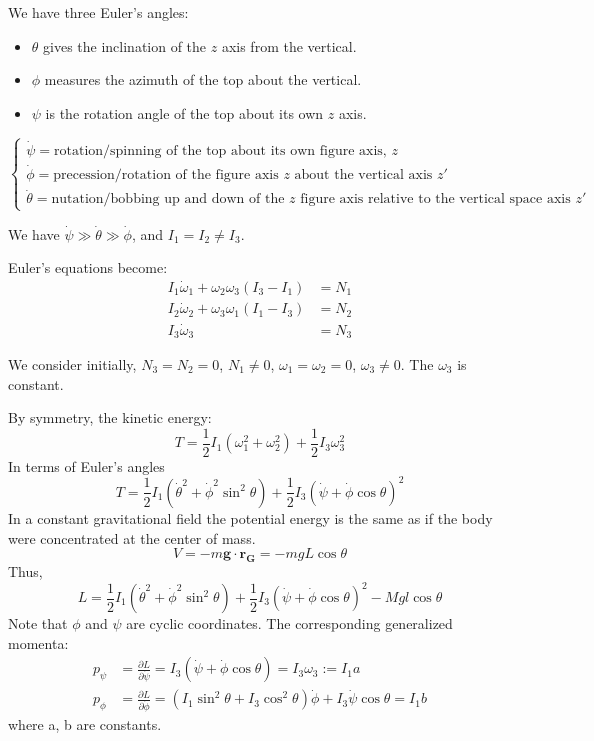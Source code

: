 \documentclass[12pt]{article}
\renewcommand{\vec}[1]{\mathbf{#1}}
\begin{document}
	We have three Euler's angles:
	\begin{itemize}
		\item $\theta$ gives the inclination of the $z$ axis from the vertical.
		\item $\phi$ measures the azimuth of the top about the vertical.
		\item $\psi$ is the rotation angle of the top about its own $z$ axis.
	\end{itemize}
	
	$$
	\begin{cases}
		\dot{\psi} = \text{rotation/spinning of the top about its own figure axis, } z \\
		\dot{\phi} = \text{precession/rotation of the figure axis } z \text{ about the vertical axis } z' \\
		\dot{\theta} = \text{nutation/bobbing up and down of the } z \text{ figure axis relative to the vertical space axis } z'
	\end{cases}
	$$
	
	We have $\dot{\psi} \gg \dot{\theta} \gg \dot{\phi}$, and $I_1 = I_2 \neq I_3$.
	
	Euler's equations become:
	\begin{align*}
		I_1 \dot{\omega}_1 + \omega_2 \omega_3 (I_3 - I_1) &= N_1 \\
		I_2 \dot{\omega}_2 + \omega_3 \omega_1 (I_1 - I_3) &= N_2 \\
		I_3 \dot{\omega}_3 &= N_3
	\end{align*}
	
	We consider initially, $N_3 = N_2 = 0$, $N_1 \neq 0$, $\omega_1 = \omega_2 = 0$, $\omega_3 \neq 0$. The $\omega_3$ is constant.
	
	By symmetry, the kinetic energy:
	$$ T = \frac{1}{2} I_1 (\omega_1^2 + \omega_2^2) + \frac{1}{2} I_3 \omega_3^2 $$
	In terms of Euler's angles
	$$ T = \frac{1}{2} I_1 (\dot{\theta}^2 + \dot{\phi}^2 \sin^2\theta) + \frac{1}{2} I_3 (\dot{\psi} + \dot{\phi} \cos\theta)^2 $$
	In a constant gravitational field the potential energy is the same as if the body were concentrated at the center of mass.
	$$ V = -m\vec{g} \cdot \vec{r_G} = -mgL\cos\theta $$
	Thus,
	$$ L = \frac{1}{2}I_1(\dot{\theta}^2 + \dot{\phi}^2\sin^2\theta) + \frac{1}{2}I_3(\dot{\psi} + \dot{\phi}\cos\theta)^2 - Mgl\cos\theta $$
	Note that $\phi$ and $\psi$ are cyclic coordinates.
	The corresponding generalized momenta:
	\begin{align*}
		p_\psi &= \frac{\partial L}{\partial \dot{\psi}} = I_3(\dot{\psi} + \dot{\phi}\cos\theta) = I_3 \omega_3 := I_1 a \\
		p_\phi &= \frac{\partial L}{\partial \dot{\phi}} = (I_1\sin^2\theta + I_3\cos^2\theta)\dot{\phi} + I_3\dot{\psi}\cos\theta = I_1 b
	\end{align*}
	where a, b are constants.
	
\end{document}

